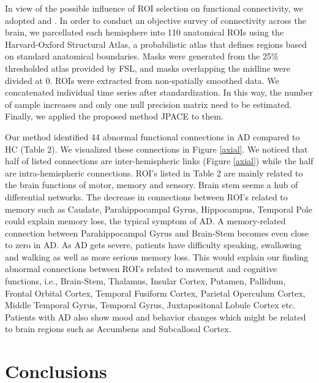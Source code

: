 \documentclass[useAMS,usenatbib,referee]{bio}
\begin{document}
{{In view of the possible influence of ROI selection on functional connectivity, we adopted \cite{Kennedy} and \cite{Makris}.
In order to conduct an objective survey of connectivity across the brain, we parcellated each hemisphere into 110 anatomical ROIs using the Harvard-Oxford Structural Atlas, a probabilistic atlas that defines regions based on standard anatomical boundaries.
Masks were generated from the 25\% thresholded atlas provided by FSL, and masks overlapping the midline were divided at 0.
ROIs were extracted from non-spatially smoothed data.
We concatenated individual time series after standardization. In this way, the number of sample increases and only one null precision matrix need to be estimated. Finally, we applied the proposed method JPACE to them.

Our method identified 44 abnormal functional connections in AD compared to HC (Table 2). 
We visualized these connections in Figure \ref{axial}.
We noticed that half of listed connections are inter-hemispheric links (Figure \ref{axial}) while the half are intra-hemispheric connections.
ROI's listed in Table 2 are mainly related to the brain functions of motor, memory and sensory.
Brain stem seems a hub of differential networks.
The decrease in connections between ROI's related to memory such as Caudate, Parahippocampal Gyrus, Hippocampus, Temporal Pole could explain memory loss, the typical symptom of AD.
A memory-related connection between Parahippocampal Gyrus and Brain-Stem becomes even close to zero in AD.
As AD gets severe, patients have difficulty speaking, swallowing and walking as well as more serious memory loss. This would explain our finding abnormal connections between ROI's related to movement and cognitive functions, i.e., Brain-Stem, Thalamus, Insular Cortex, Putamen, Pallidum, Frontal Orbital Cortex, Temporal Fusiform Cortex, Parietal Operculum Cortex, Middle Temporal Gyrus, Temporal Gyrus, Juxtapositonal Lobule Cortex etc.
Patients with AD also show mood and behavior changes which might be related to brain regions such as Accumbens and Subcallosal Cortex.



\section{Conclusions}

}}
\end{document}
